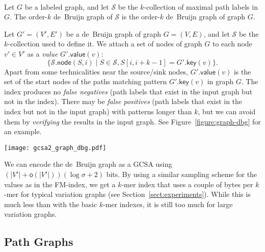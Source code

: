 \documentclass[twoside,leqno,twocolumn]{article}
\newcommand{\set}[1]{\ensuremath{\{ #1 \}}}
\newcommand{\abs}[1]{\ensuremath{\lvert #1 \rvert}}
\newcommand{\oh}[1]{\ensuremath{\mathsf{o}\!\left( #1 \right)}}
\newcommand{\glabel}{\ensuremath{\mathsf{label}}}
\newcommand{\gkey}{\ensuremath{\mathsf{key}}}
\newcommand{\gvalue}{\ensuremath{\mathsf{value}}}
\newcommand{\gnode}{\ensuremath{\mathsf{node}}}
\newcommand{\kmer}[1]{$#1$\nobreakdash-mer}
\newcommand{\kcollection}[1]{$#1$\nobreakdash-collection}
\newcommand{\orderk}[1]{order\nobreakdash-$#1$}
\begin{document}
\begin{Definition}\label{def:dbg} ~\\
Let $G$ be a labeled graph, and let $\mathcal{S}$ be the \kcollection{k} of maximal path labels in $G$. The \orderk{k} de~Bruijn graph of $\mathcal{S}$ is the \orderk{k} de~Bruijn graph of graph $G$.
\end{Definition}

Let $G' = (V', E')$ be a de~Bruijn graph of graph $G = (V, E)$, and let $\mathcal{S}$ be the \kcollection{k} used to define it. We attach a set of nodes of graph $G$ to each node $v' \in V'$ as a \emph{value} $G'.\gvalue(v)$:
$$
\set{ \mathcal{S}.\gnode(S, i) \mid S \in \mathcal{S}, S[i, i+k-1] = G'.\gkey(v)}.
$$
Apart from some technicalities near the source/sink nodes, $G'.\gvalue(v)$ is the set of the start nodes of the paths matching pattern $G'.\gkey(v)$ in graph $G$. The index produces no \emph{false negatives} (path labels that exist in the input graph but not in the index). There may be \emph{false positives} (path labels that exist in the index but not in the input graph) with patterns longer than $k$, but we can avoid them by \emph{verifying} the results in the input graph. See Figure~\ref{figure:graph-dbg} for an example.

\begin{figure*}[t!]
\texttt{[image: gcsa2\_graph\_dbg.pdf]}
\caption{Left: Input graph $G = (V, E)$, with each node $v \in V$ labeled with $v:G.\glabel(v)$. Right: The \protect\orderk{3} de~Bruijn graph $G' = (V', E')$ of graph $G$, with each node $v' \in V'$ labeled with $G'.\gkey(v')$ and $G'.\gvalue(v')$. Both: Edges $(t, s)$ are not shown. The highlighted path in the de~Bruijn graph is a false positive, as it consists of two disjoint paths in the input graph.}\label{figure:graph-dbg}
\end{figure*}

We can encode the de~Bruijn graph as a GCSA using $(\abs{V'} + \oh{\abs{V'}})(\log \sigma + 2)$ bits. By using a similar sampling scheme for the values as in the FM-index, we get a \kmer{k} index that uses a couple of bytes per \kmer{k} for typical variation graphs (see Section~\ref{sect:experiments}). While this is much less than with the basic \kmer{k} indexes, it is still too much for large variation graphs.

\subsection{Path Graphs}
\end{document}
